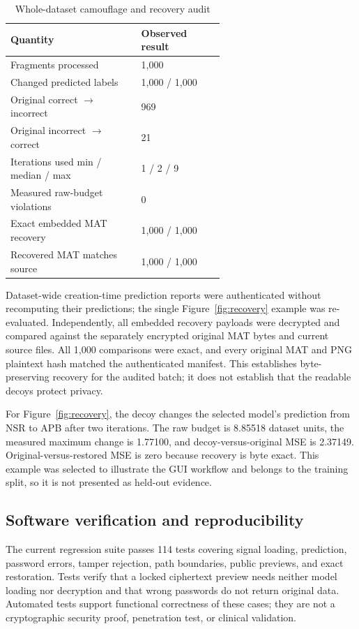 \documentclass{jpp}
\begin{document}
\begin{table}
\centering
\caption{Whole-dataset camouflage and recovery audit}\label{tab:audit}
\small
\begin{tabular}{p{0.61\linewidth}l}
\hline
Quantity & Observed result \\
\hline
Fragments processed & 1,000 \\
Changed predicted labels & 1,000 / 1,000 \\
Original correct $\rightarrow$ incorrect & 969 \\
Original incorrect $\rightarrow$ correct & 21 \\
Iterations used min / median / max & 1 / 2 / 9 \\
Measured raw-budget violations & 0 \\
Exact embedded MAT recovery & 1,000 / 1,000 \\
Recovered MAT matches source & 1,000 / 1,000 \\
\hline
\end{tabular}
\end{table}

Dataset-wide creation-time prediction reports were authenticated without recomputing their predictions; the single Figure~\ref{fig:recovery} example was re-evaluated. Independently, all embedded recovery payloads were decrypted and compared against the separately encrypted original MAT bytes and current source files. All 1,000 comparisons were exact, and every original MAT and PNG plaintext hash matched the authenticated manifest. This establishes byte-preserving recovery for the audited batch; it does not establish that the readable decoys protect privacy.

For Figure~\ref{fig:recovery}, the decoy changes the selected model's prediction from NSR to APB after two iterations. The raw budget is 8.85518 dataset units, the measured maximum change is 1.77100, and decoy-versus-original MSE is 2.37149. Original-versus-restored MSE is zero because recovery is byte exact. This example was selected to illustrate the GUI workflow and belongs to the training split, so it is not presented as held-out evidence.

\subsection{Software verification and reproducibility}

The current regression suite passes 114 tests covering signal loading, prediction, password errors, tamper rejection, path boundaries, public previews, and exact restoration. Tests verify that a locked ciphertext preview needs neither model loading nor decryption and that wrong passwords do not return original data. Automated tests support functional correctness of these cases; they are not a cryptographic security proof, penetration test, or clinical validation.
\end{document}
